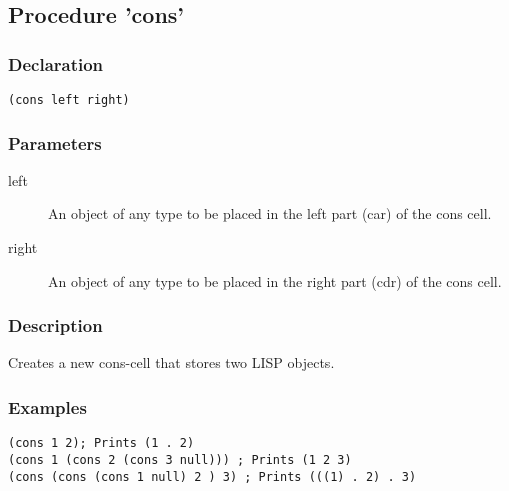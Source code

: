 \subsection{Procedure 'cons'}
\label{builtins/cons}

\subsubsection*{Declaration}
\begin{lstlisting}
(cons left right)
\end{lstlisting}

\subsubsection*{Parameters}
\begin{description}
	\item[left] An object of any type to be placed in the left part (car) of the cons cell.
	\item[right] An object of any type to be placed in the right part (cdr) of the cons cell.
\end{description}

\subsubsection*{Description}
Creates a new cons-cell that stores two LISP objects.

\subsubsection*{Examples}
\begin{lstlisting}
(cons 1 2); Prints (1 . 2)
(cons 1 (cons 2 (cons 3 null))) ; Prints (1 2 3)
(cons (cons (cons 1 null) 2 ) 3) ; Prints (((1) . 2) . 3)
\end{lstlisting}
